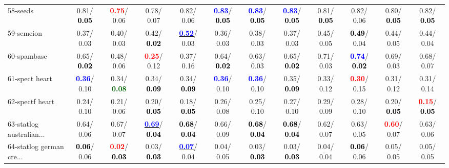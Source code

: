 \begin{table}[h]
\begin{center}
{\begin{tabular}{lc|c|c|c|c|c|c|c|c|c|c}
58-seeds &   0.81/\textcolor{black}{\textbf{  0.05}} & \textcolor{red}{\textbf{  0.75}}/  0.06 &   0.78/  0.07 &   0.82/  0.06 & \textcolor{blue}{\textbf{  0.83}}/\textcolor{black}{\textbf{  0.05}} & \textcolor{blue}{\textbf{  0.83}}/\textcolor{black}{\textbf{  0.05}} & \textcolor{blue}{\textbf{  0.83}}/\textcolor{black}{\textbf{  0.05}} &   0.81/\textcolor{black}{\textbf{  0.05}} &   0.82/  0.06 &   0.80/\textcolor{black}{\textbf{  0.05}} &   0.82/\textcolor{black}{\textbf{  0.05}} \\
59-semeion &   0.37/  0.03 &   0.40/  0.03 &   0.42/\textcolor{black}{\textbf{  0.02}} & \underline{\textcolor{blue}{\textbf{  0.52}}}/  0.03 &   0.36/  0.03 &   0.38/  0.03 &   0.37/  0.03 &   0.45/  0.05 & \textcolor{black}{\textbf{  0.49}}/  0.04 &   0.44/  0.05 &   0.44/  0.04 \\
60-spambase &   0.65/\textcolor{black}{\textbf{  0.02}} &   0.48/  0.06 & \textcolor{red}{\textbf{  0.25}}/  0.12 &   0.37/  0.16 &   0.64/\textcolor{black}{\textbf{  0.02}} &   0.63/  0.03 &   0.65/\textcolor{black}{\textbf{  0.02}} &   0.71/  0.03 & \textcolor{blue}{\textbf{  0.74}}/\textcolor{black}{\textbf{  0.02}} &   0.69/  0.03 &   0.68/  0.07 \\ \hline
61-spect heart & \textcolor{blue}{\textbf{  0.36}}/  0.10 &   0.34/\textcolor{darkgreen}{\textbf{  0.08}} &   0.34/\textcolor{black}{\textbf{  0.09}} &   0.34/\textcolor{black}{\textbf{  0.09}} & \textcolor{blue}{\textbf{  0.36}}/  0.10 & \textcolor{blue}{\textbf{  0.36}}/  0.10 &   0.35/\textcolor{black}{\textbf{  0.09}} &   0.33/  0.12 & \textcolor{red}{\textbf{  0.30}}/  0.15 &   0.31/  0.12 &   0.31/  0.14 \\
62-spectf heart &   0.24/  0.10 &   0.21/  0.06 &   0.20/\textcolor{black}{\textbf{  0.05}} &   0.18/\textcolor{black}{\textbf{  0.05}} &   0.26/  0.08 &   0.25/  0.10 &   0.27/  0.10 &   0.29/  0.09 &   0.28/  0.10 &   0.20/\textcolor{black}{\textbf{  0.05}} & \textcolor{red}{\textbf{  0.15}}/\textcolor{black}{\textbf{  0.05}} \\
63-statlog australian... &   0.64/  0.06 &   0.67/  0.07 & \underline{\textcolor{blue}{\textbf{  0.69}}}/\textcolor{black}{\textbf{  0.04}} & \textcolor{black}{\textbf{  0.68}}/\textcolor{black}{\textbf{  0.04}} &   0.66/  0.09 & \textcolor{black}{\textbf{  0.68}}/\textcolor{black}{\textbf{  0.04}} & \textcolor{black}{\textbf{  0.68}}/\textcolor{black}{\textbf{  0.04}} &   0.62/  0.07 &   0.63/  0.05 & \textcolor{red}{\textbf{  0.60}}/  0.07 &   0.63/  0.06 \\
64-statlog german cre... & \textcolor{black}{\textbf{  0.06}}/  0.06 & \textcolor{red}{\textbf{  0.02}}/\textcolor{black}{\textbf{  0.03}} &   0.03/\textcolor{black}{\textbf{  0.03}} & \underline{\textcolor{blue}{\textbf{  0.07}}}/  0.04 &   0.04/  0.05 &   0.03/\textcolor{black}{\textbf{  0.03}} &   0.03/\textcolor{black}{\textbf{  0.03}} &   0.04/  0.04 & \textcolor{black}{\textbf{  0.06}}/  0.06 &   0.05/  0.05 &   0.05/  0.05 \\\end{tabular}
}\label{strats1bNB}
\end{center}
\end{table}

